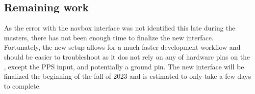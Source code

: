 \subsection{Remaining work}
As the error with the \gls{navbox} interface was not identified this late during the masters, there has not been enough time to finalize the new interface.
Fortunately, the new setup allows for a much faster development workflow and should be easier to troubleshoot as it dos not rely on any of hardware pins on the \jx, except the PPS input, and potentially a ground pin.
The new interface will be finalized the beginning of the fall of 2023 and is estimated to only take a few days to complete.





